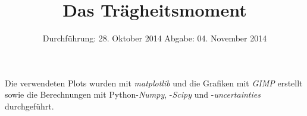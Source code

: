 
\subject{ANFÄNGERPRAKTIKUM V101}
\title{Das Trägheitsmoment}
\date{
  Durchführung: 28. Oktober 2014
  \hspace{1em}
  Abgabe: 04. November 2014
}



\maketitle
\thispagestyle{empty}
\newpage



\newpage


\nocite{V101}
\printbibliography
\noindent Die verwendeten Plots wurden mit \textit{matplotlib}\cite{matplotlib} und die Grafiken mit \textit{GIMP}\cite{gimp} erstellt sowie die Berechnungen mit Python-\textit{Numpy}\cite{numpy}, -\textit{Scipy}\cite{scipy} und -\textit{uncertainties}\cite{uncertainties} durchgeführt.

